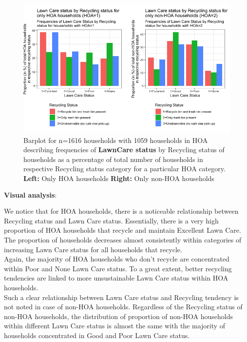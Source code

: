 \documentclass{article}
\begin{document}
\begin{figure}[H]
\centering
\includegraphics[scale=2]{LawnCareRecycle.png}
\caption{Barplot for n=1616 households with 1059 households in HOA describing frequencies of \textbf{LawnCare status} by Recycling status of households as a percentage of total number of households in respective Recycling status category for a particular HOA category. \textbf{Left:} Only HOA households \textbf{Right:} Only non-HOA households} \label{Fig:Plot1}
\end{figure}

\textbf{Visual analysis}:

We notice that for HOA households, there is a noticeable relationship between Recycling status and Lawn Care status. Essentially, there is a very high proportion of HOA households that recycle and maintain Excellent Lawn Care. The proportion of households decreases almost consistently within categories of increasing Lawn Care status for all households that recycle.\\

Again, the majority of HOA households who don't recycle are concentrated within Poor and None Lawn Care status. To a great extent, better recycling tendencies are linked to more unsustainable Lawn Care status within HOA households.\\

Such a clear relationship between Lawn Care status and Recycling tendency is not noted in case of non-HOA households. Regardless of the Recycling status of non-HOA households, the distribution of proportion of non-HOA households within different Lawn Care status is almost the same with the majority of households concentrated in Good and Poor Lawn Care status.\\
\end{document}
